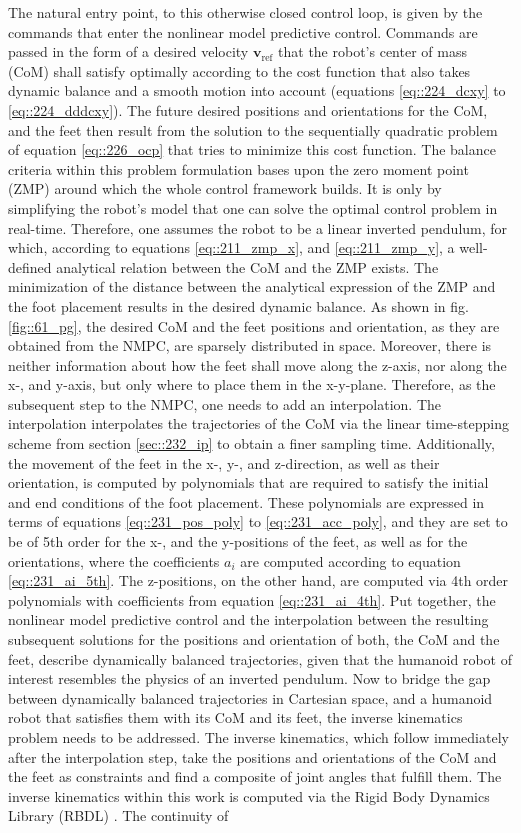 The natural entry point, to this otherwise closed control loop, is given by the commands that enter the nonlinear model predictive control. Commands are passed in the form of a desired velocity $\mathbf{v}_\text{ref}$ that the robot's center of mass (CoM) shall satisfy optimally according to the cost function that also takes dynamic balance and a smooth motion into account (equations \ref{eq::224_dcxy} to \ref{eq::224_dddcxy}). The future desired positions and orientations for the CoM, and the feet then result from the solution to the sequentially quadratic problem of equation \ref{eq::226_ocp} that tries to minimize this cost function. The balance criteria within this problem formulation bases upon the zero moment point (ZMP) around which the whole control framework builds. It is only by simplifying the robot's model that one can solve the optimal control problem in real-time. Therefore, one assumes the robot to be a linear inverted pendulum, for which, according to equations \ref{eq::211_zmp_x}, and \ref{eq::211_zmp_y}, a well-defined analytical relation between the CoM and the ZMP exists. The minimization of the distance between the analytical expression of the ZMP and the foot placement results in the desired dynamic balance. As shown in fig. \ref{fig::61_pg}, the desired CoM and the feet positions and orientation, as they are obtained from the NMPC, are sparsely distributed in space. Moreover, there is neither information about how the feet shall move along the z-axis, nor along the x-, and y-axis, but only where to place them in the x-y-plane. Therefore, as the subsequent step to the NMPC, one needs to add an interpolation. The interpolation interpolates the trajectories of the CoM via the linear time-stepping scheme from section \ref{sec::232_ip} to obtain a finer sampling time. Additionally, the movement of the feet in the x-, y-, and z-direction, as well as their orientation, is computed by polynomials that are required to satisfy the initial and end conditions of the foot placement. These polynomials are expressed in terms of equations \ref{eq::231_pos_poly} to \ref{eq::231_acc_poly}, and they are set to be of 5th order for the x-, and the y-positions of the feet, as well as for the orientations, where the coefficients $a_i$ are computed according to equation \ref{eq::231_ai_5th}. The z-positions, on the other hand, are computed via 4th order polynomials with coefficients from equation \ref{eq::231_ai_4th}. Put together, the nonlinear model predictive control and the interpolation between the resulting subsequent solutions for the positions and orientation of both, the CoM and the feet, describe dynamically balanced trajectories, given that the humanoid robot of interest resembles the physics of an inverted pendulum. Now to bridge the gap between dynamically balanced trajectories in Cartesian space, and a humanoid robot that satisfies them with its CoM and its feet, the inverse kinematics problem needs to be addressed. The inverse kinematics, which follow immediately after the interpolation step, take the positions and orientations of the CoM and the feet as constraints and find a composite of joint angles that fulfill them. The inverse kinematics within this work is computed via the Rigid Body Dynamics Library (RBDL) \cite{felis2017rbdl}. The continuity of 